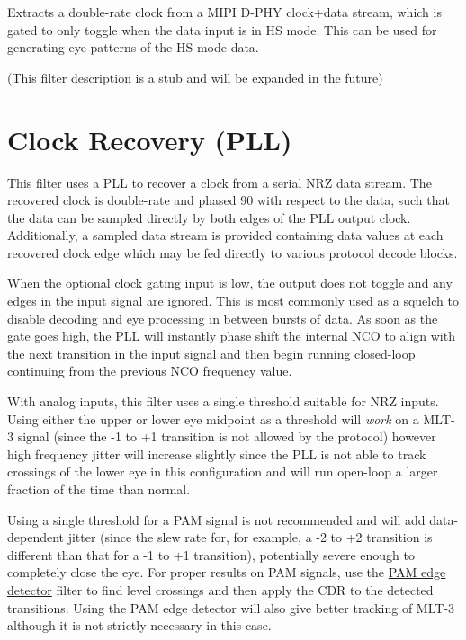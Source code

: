 Extracts a double-rate clock from a MIPI D-PHY clock+data stream, which is gated to only toggle when the data input
is in HS mode. This can be used for generating eye patterns of the HS-mode data.

(This filter description is a stub and will be expanded in the future)

\pagebreak
\section{Clock Recovery (PLL)}
\label{filter:cdrpll}

This filter uses a PLL to recover a clock from a serial NRZ data stream. The recovered clock is double-rate and phased
90\textdegree{} with respect to the data, such that the data can be sampled directly by both edges of the PLL output
clock. Additionally, a sampled data stream is provided containing data values at each recovered clock edge which may be
fed directly to various protocol decode blocks.

When the optional clock gating input is low, the output does not toggle and any edges in the input signal are ignored.
This is most commonly used as a squelch to disable decoding and eye processing in between bursts of data. As soon as
the gate goes high, the PLL will instantly phase shift the internal NCO to align with the next transition in the input
signal and then begin running closed-loop continuing from the previous NCO frequency value.

With analog inputs, this filter uses a single threshold suitable for NRZ inputs. Using either the upper or lower eye
midpoint as a threshold will \emph{work} on a MLT-3 signal (since the -1 to +1 transition is not allowed by the
protocol) however high frequency jitter will increase slightly since the PLL is not able to track crossings of the
lower eye in this configuration and will run open-loop a larger fraction of the time than normal.

Using a single threshold for a PAM signal is not recommended and will add data-dependent jitter (since the slew rate
for, for example, a -2 to +2 transition is different than that for a -1 to +1 transition), potentially severe enough to
completely close the eye. For proper results on PAM signals, use the \hyperref[filter:pamedge]{PAM edge detector}
filter to find level crossings and then apply the CDR to the detected transitions. Using the PAM edge detector will
also give better tracking of MLT-3 although it is not strictly necessary in this case.

